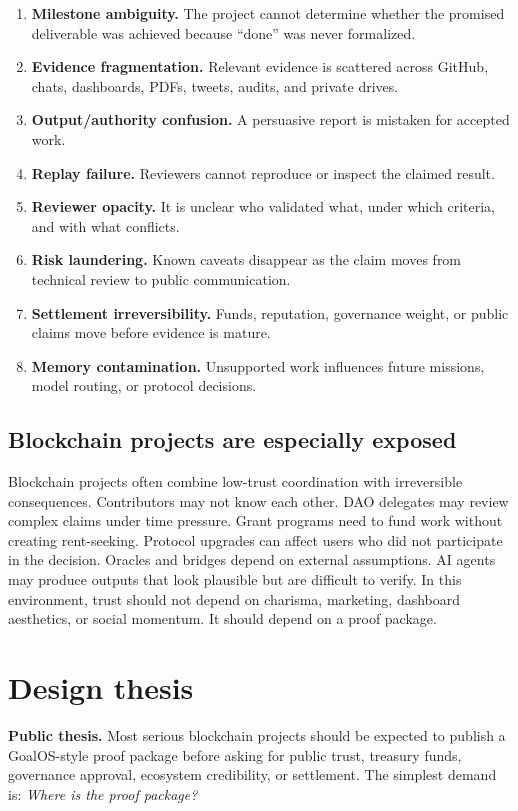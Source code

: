 \begin{enumerate}
  \item \textbf{Milestone ambiguity.} The project cannot determine whether the promised deliverable was achieved because ``done'' was never formalized.
  \item \textbf{Evidence fragmentation.} Relevant evidence is scattered across GitHub, chats, dashboards, PDFs, tweets, audits, and private drives.
  \item \textbf{Output/authority confusion.} A persuasive report is mistaken for accepted work.
  \item \textbf{Replay failure.} Reviewers cannot reproduce or inspect the claimed result.
  \item \textbf{Reviewer opacity.} It is unclear who validated what, under which criteria, and with what conflicts.
  \item \textbf{Risk laundering.} Known caveats disappear as the claim moves from technical review to public communication.
  \item \textbf{Settlement irreversibility.} Funds, reputation, governance weight, or public claims move before evidence is mature.
  \item \textbf{Memory contamination.} Unsupported work influences future missions, model routing, or protocol decisions.
\end{enumerate}

\subsection{Blockchain projects are especially exposed}

Blockchain projects often combine low-trust coordination with irreversible consequences. Contributors may not know each other. DAO delegates may review complex claims under time pressure. Grant programs need to fund work without creating rent-seeking. Protocol upgrades can affect users who did not participate in the decision. Oracles and bridges depend on external assumptions. AI agents may produce outputs that look plausible but are difficult to verify. In this environment, trust should not depend on charisma, marketing, dashboard aesthetics, or social momentum. It should depend on a proof package.

\section{Design thesis}

\begin{prbox}
\textbf{Public thesis.} Most serious blockchain projects should be expected to publish a GoalOS-style proof package before asking for public trust, treasury funds, governance approval, ecosystem credibility, or settlement. The simplest demand is: \emph{Where is the proof package?}
\end{prbox}

